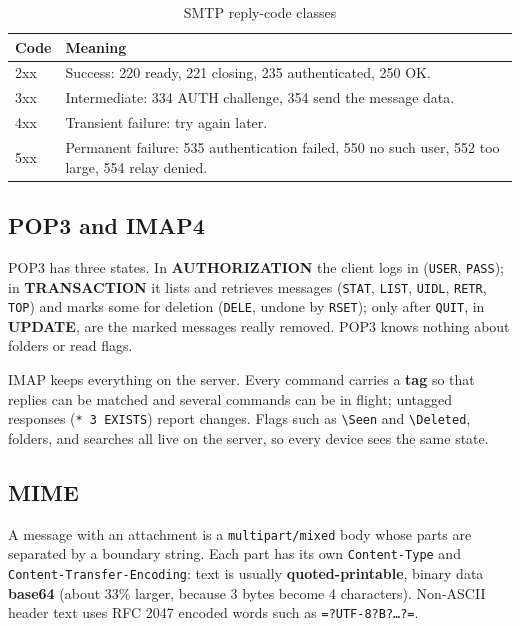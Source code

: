 \documentclass[11pt,a4paper]{article}
\begin{document}
\begin{table}[H]
\centering
\caption{SMTP reply-code classes}
\small
\begin{tabularx}{\textwidth}{@{}lY@{}}
\toprule
\textbf{Code} & \textbf{Meaning} \\ \midrule
2xx & Success: 220 ready, 221 closing, 235 authenticated, 250 OK. \\
3xx & Intermediate: 334 AUTH challenge, 354 send the message data. \\
4xx & Transient failure: try again later. \\
5xx & Permanent failure: 535 authentication failed, 550 no such user, 552 too large, 554 relay denied. \\ \bottomrule
\end{tabularx}
\end{table}

\subsection{POP3 and IMAP4}
POP3 has three states. In \textbf{AUTHORIZATION} the client logs in (\texttt{USER}, \texttt{PASS}); in \textbf{TRANSACTION} it lists and retrieves messages (\texttt{STAT}, \texttt{LIST}, \texttt{UIDL}, \texttt{RETR}, \texttt{TOP}) and marks some for deletion (\texttt{DELE}, undone by \texttt{RSET}); only after \texttt{QUIT}, in \textbf{UPDATE}, are the marked messages really removed. POP3 knows nothing about folders or read flags.

IMAP keeps everything on the server. Every command carries a \textbf{tag} so that replies can be matched and several commands can be in flight; untagged responses (\texttt{* 3 EXISTS}) report changes. Flags such as \texttt{\textbackslash Seen} and \texttt{\textbackslash Deleted}, folders, and searches all live on the server, so every device sees the same state.

\subsection{MIME}
A message with an attachment is a \texttt{multipart/mixed} body whose parts are separated by a boundary string. Each part has its own \texttt{Content-Type} and \texttt{Content-Transfer-Encoding}: text is usually \textbf{quoted-printable}, binary data \textbf{base64} (about 33\% larger, because 3 bytes become 4 characters). Non-ASCII header text uses RFC 2047 encoded words such as \texttt{=?UTF-8?B?\ldots?=}.

\end{document}
